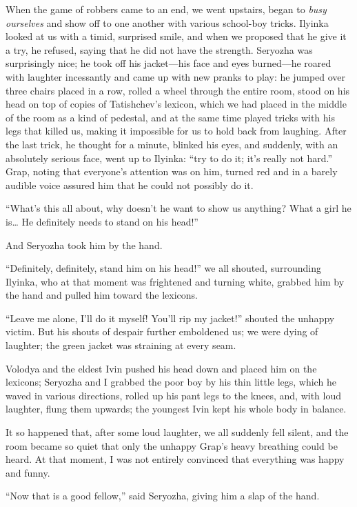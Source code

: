 When the game of robbers came to an end, we went upstairs, began to \emph{busy ourselves} and show off to one another with various school-boy tricks. Ilyinka looked at us with a timid, surprised smile, and when we proposed that he give it a try, he refused, saying that he did not have the strength. Seryozha was surprisingly nice; he took off his jacket---his face and eyes burned---he roared with laughter incessantly and came up with new pranks to play: he jumped over three chairs placed in a row, rolled a wheel through the entire room, stood on his head on top of copies of Tatishchev's lexicon, which we had placed in the middle of the room as a kind of pedestal, and at the same time played tricks with his legs that killed us, making it impossible for us to hold back from laughing. After the last trick, he thought for a minute, blinked his eyes, and suddenly, with an absolutely serious face, went up to Ilyinka: ``try to do it; it's really not hard.'' Grap, noting that everyone's attention was on him, turned red and in a barely audible voice assured him that he could not possibly do it. %

``What's this all about, why doesn't he want to show us anything? What a girl he is\ldots{} He definitely needs to stand on his head!'' %

And Seryozha took him by the hand.

``Definitely, definitely, stand him on his head!'' we all shouted, surrounding Ilyinka, who at that moment was frightened and turning white, grabbed him by the hand and pulled him toward the lexicons.

``Leave me alone, I'll do it myself! You'll rip my jacket!'' shouted the unhappy victim. But his shouts of despair further emboldened us; we were dying of laughter; the green jacket was straining at every seam.

Volodya and the eldest Ivin pushed his head down and placed him on the lexicons; Seryozha and I grabbed the poor boy by his thin little legs, which he waved in various directions, rolled up his pant legs to the knees, and, with loud laughter, flung them upwards; the youngest Ivin kept his whole body in balance.

It so happened that, after some loud laughter, we all suddenly fell silent, and the room became so quiet that only the unhappy Grap's heavy breathing could be heard. At that moment, I was not entirely convinced that everything was happy and funny.

``Now that is a good fellow,'' said Seryozha, giving him a slap of the hand. %

